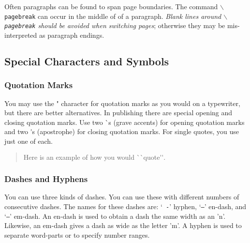 \documentclass[11pt]{article}
\newcommand{\cmd}[1]{{\tt $\backslash$#1}}
\begin{document}
Often paragraphs can be found to span page boundaries. The command
\cmd{pagebreak} can occur in the middle of of a paragraph. \emph{Blank
  lines around \cmd{pagebreak} should be avoided when switching
  pages}; otherwise they may be mis-interpreted as paragraph endings.

\subsection{Special Characters and Symbols}

\subsubsection{Quotation Marks}

You may use the " character for quotation marks as you would on a
typewriter, but there are better alternatives. In publishing there are
special opening and closing quotation marks. Use two \`{}s (grave
accents) for opening quotation marks and two \'{}s (apostrophe) for
closing quotation marks. For single quotes, you use just one of each.

\begin{quote}
  Here is an example of how you would \`{}\`{}quote\'{}\'{}.
\end{quote}

\subsubsection{Dashes and Hyphens}



You can use three kinds of dashes. You can use these with different
numbers of consecutive dashes. The names for these dashes are: `{\tt
  -}' hyphen, `{\tt --}' en-dash, and `{\tt ---}' em-dash. An en-dash
is used to obtain a dash the same width as an 'n'. Likewise, an
em-dash gives a dash as wide as the letter 'm'. A hyphen is used to
separate word-parts or to specify number ranges.
\end{document}
